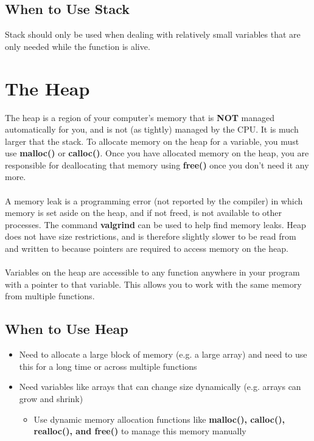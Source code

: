 \documentclass{article}
\begin{document}
\subsection{When to Use Stack}
Stack should only be used when dealing with relatively small variables that are only needed while the function is alive.

\section{The Heap}
The heap is a region of your computer’s memory that is \textbf{NOT} managed automatically for you, and is not (as tightly) managed by the CPU.
It is much larger that the stack. 
To allocate memory on the heap for a variable, you must use \textbf{malloc()} or \textbf{calloc()}.
Once you have allocated memory on the heap, you are responsible for deallocating that memory using \textbf{free()} once you don't need it any more.\\
\\ A memory leak is a programming error (not reported by the compiler) in which memory is set aside on the heap, and if not freed, is not available to other processes.
The command \textbf{valgrind} can be used to help find memory leaks.
Heap does not have size restrictions, and is therefore slightly slower to be read from and written to because pointers are required to access memory on the heap.\\
\\ Variables on the heap are accessible to any function anywhere in your program with a pointer to that variable. This allows you to work with the same memory from multiple functions.

\subsection{When to Use Heap}
\begin{itemize}
    \item Need to allocate a large block of memory (e.g. a large array) and need to use this for a long time or across multiple functions
    \item Need variables like arrays that can change size dynamically (e.g. arrays can grow and shrink)
    \begin{itemize}
        \item Use dynamic memory allocation functions like \textbf{malloc(), calloc(), realloc(), and free()} to manage this memory manually
    \end{itemize}
\end{itemize}
\end{document}
